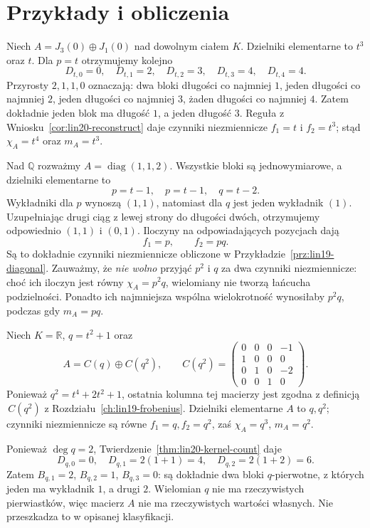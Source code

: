 \section{Przykłady i obliczenia}
\label{sec:lin20-examples}

\begin{przyklad}
\label{prz:lin20-nilpotent}
Niech \(A=J_3(0)\oplus J_1(0)\)
nad dowolnym ciałem \(K\).
Dzielniki elementarne to \(t^3\) oraz \(t\).
Dla \(p=t\) otrzymujemy kolejno
\[
 D_{t,0}=0,\quad D_{t,1}=2,\quad
 D_{t,2}=3,\quad D_{t,3}=4,\quad
 D_{t,4}=4.
\]
Przyrosty \(2,1,1,0\)
oznaczają: dwa bloki długości
co najmniej \(1\), jeden długości
co najmniej \(2\), jeden długości
co najmniej \(3\), żaden długości
co najmniej \(4\).
Zatem dokładnie jeden blok
ma długość \(1\), a jeden długość \(3\).
Reguła z Wniosku~\ref{cor:lin20-reconstruct}
daje czynniki niezmiennicze
\(f_1=t\) i \(f_2=t^3\);
stąd \(\chi_A=t^4\) oraz \(m_A=t^3\).
\end{przyklad}

\begin{przyklad}
\label{prz:lin20-diagonal}
Nad \(\mathbb Q\) rozważmy
\(A=\operatorname{diag}(1,1,2)\).
Wszystkie bloki są jednowymiarowe,
a dzielniki elementarne to
\[
 p=t-1,\quad p=t-1,\quad q=t-2.
\]
Wykładniki dla \(p\) wynoszą \((1,1)\),
natomiast dla \(q\) jest jeden
wykładnik \((1)\).
Uzupełniając drugi ciąg z lewej
strony do długości dwóch,
otrzymujemy odpowiednio
\((1,1)\) i \((0,1)\).
Iloczyny na odpowiadających
pozycjach dają
\[
 f_1=p,\qquad f_2=pq.
\]
Są to dokładnie czynniki niezmiennicze
obliczone w
Przykładzie~\ref{prz:lin19-diagonal}.
Zauważmy, że \emph{nie wolno}
przyjąć \(p^2\) i \(q\) za dwa
czynniki niezmiennicze: choć ich
iloczyn jest równy \(\chi_A=p^2q\),
wielomiany nie tworzą łańcucha
podzielności. Ponadto ich najmniejsza
wspólna wielokrotność wynosiłaby \(p^2q\),
podczas gdy \(m_A=pq\).
\end{przyklad}

\begin{przyklad}
\label{prz:lin20-real}
Niech \(K=\mathbb R\),
\(q=t^2+1\) oraz
\[
 A=C(q)\oplus C(q^2),
 \qquad
 C(q^2)=
 \begin{pmatrix}
 0&0&0&-1\\
 1&0&0&0\\
 0&1&0&-2\\
 0&0&1&0
 \end{pmatrix}.
\]
Ponieważ \(q^2=t^4+2t^2+1\),
ostatnia kolumna tej macierzy
jest zgodna z definicją
\(\,C(q^2)\) z
Rozdziału~\ref{ch:lin19-frobenius}.
Dzielniki elementarne \(A\)
to \(q,q^2\); czynniki niezmiennicze
są równe \(f_1=q,f_2=q^2\),
zaś \(\chi_A=q^3\), \(m_A=q^2\).

Ponieważ \(\deg q=2\),
Twierdzenie~\ref{thm:lin20-kernel-count}
daje
\[
 D_{q,0}=0,\quad D_{q,1}=2(1+1)=4,
 \quad D_{q,2}=2(1+2)=6.
\]
Zatem \(B_{q,1}=2\), \(B_{q,2}=1\),
\(B_{q,3}=0\): są dokładnie dwa
bloki \(q\)-pierwotne, z których jeden
ma wykładnik \(1\), a drugi \(2\).
Wielomian \(q\) nie ma rzeczywistych
pierwiastków, więc macierz \(A\)
nie ma rzeczywistych wartości własnych.
Nie przeszkadza to w opisanej klasyfikacji.
\end{przyklad}

